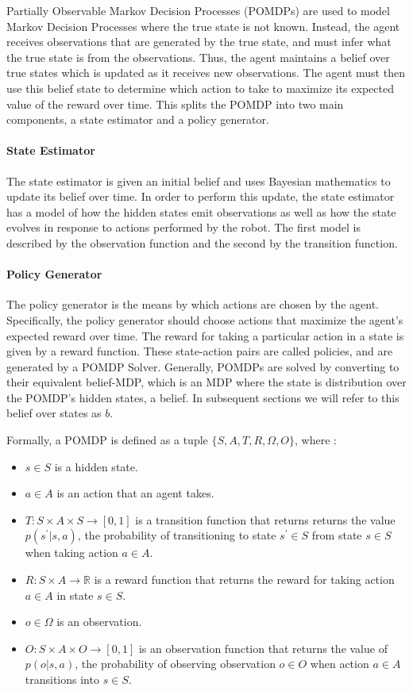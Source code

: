 \documentclass{article}
\begin{document}
\begin{multicols}{2}
Partially Observable Markov Decision Processes (POMDPs) are used to model Markov Decision Processes where the true state is not known. Instead, the agent receives observations that are generated by the true state, and must infer what the true state is from the observations. Thus, the agent maintains a belief over true states which is updated as it receives new observations. The agent must then use this belief state to determine which action to take to maximize its expected value of the reward over time. This splits the POMDP into two main components, a state estimator and a policy generator. 

\paragraph{State Estimator}

The state estimator is given an initial belief and uses Bayesian mathematics to update its belief over time. In order to perform this update, the state estimator has a model of how the hidden states emit observations as well as how the state evolves in response to actions performed by the robot. The first model is described by the observation function and the second by the transition function. 

\paragraph{Policy Generator}

The policy generator is the means by which actions are chosen by the agent. Specifically, the policy generator should choose actions that maximize the agent's expected reward over time. The reward for taking a particular action in a state is given by a reward function. These state-action pairs are called policies, and are generated by a POMDP Solver. Generally, POMDPs are solved by converting to their equivalent belief-MDP, which is an MDP where the state is distribution over the POMDP's hidden states, a belief. In subsequent sections we will refer to this belief over states as $b$. 


Formally, a POMDP is defined as a tuple $\{S, A, T, R, \Omega, O\}$, where : 
\begin{itemize}
	\item $s \in S$ is a hidden state. 
	\item $a \in A$ is an action that an agent takes. 
	\item $T: S \times A \times S \to [0, 1]$ is a transition function that returns returns the value $p(s^\prime | s, a)$, the probability of transitioning to state $s^\prime \in  S$ from state $s \in S$ when taking action $a \in A$. 
	\item $R: S \times A \to \mathbb{R}$ is a reward function that returns the reward for taking action $a \in A$ in state $s \in S$. 
	\item $o \in \Omega$ is an observation. 
	\item $O: S \times A \times O \to [0, 1]$ is an observation function that returns the value of $p(o | s, a)$, the probability of observing observation $o \in O$ when action $a \in A$ transitions into $s \in S$. 
\end{itemize}


\end{multicols}
\end{document}
